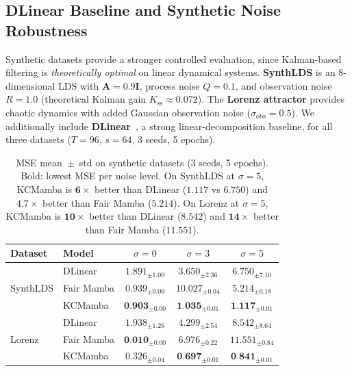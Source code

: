 \subsection{DLinear Baseline and Synthetic Noise Robustness}
\label{sec:dlinear_synth}

Synthetic datasets provide a stronger controlled evaluation, since Kalman-based filtering
is \emph{theoretically optimal} on linear dynamical systems.
\textbf{SynthLDS} is an 8-dimensional LDS with $\mathbf{A}=0{.}9\mathbf{I}$,
process noise $Q=0{.}1$, and observation noise $R=1{.}0$ (theoretical
Kalman gain $K_\text{ss}\approx0{.}072$).
The \textbf{Lorenz attractor} provides chaotic dynamics with added Gaussian
observation noise ($\sigma_\text{obs}=0{.}5$).
We additionally include \textbf{DLinear}~\cite{zeng2023transformers}, a strong
linear-decomposition baseline, for all three datasets
($T{=}96$, $s{=}64$, 3 seeds, 5 epochs).

\begin{table}[H]
  \centering
  \small
  \begin{tabular}{|l|l|ccc|}
    \hline
    \textbf{Dataset} & \textbf{Model} &
    $\sigma=0$ & $\sigma=3$ & $\sigma=5$ \\
    \hline\hline
    \multirow{3}{*}{SynthLDS}
      & DLinear    & $1{.}891_{\pm1{.}00}$ & $3{.}650_{\pm2{.}36}$ & $6{.}750_{\pm7{.}10}$ \\
      & Fair Mamba & $0{.}939_{\pm0{.}00}$ & $10{.}027_{\pm0{.}04}$ & $5{.}214_{\pm0{.}18}$ \\
      & KCMamba    & $\mathbf{0{.}903}_{\pm0{.}00}$ & $\mathbf{1{.}035}_{\pm0{.}01}$ & $\mathbf{1{.}117}_{\pm0{.}01}$ \\
    \hline
    \multirow{3}{*}{Lorenz}
      & DLinear    & $1{.}938_{\pm1{.}26}$ & $4{.}299_{\pm2{.}54}$ & $8{.}542_{\pm8{.}64}$ \\
      & Fair Mamba & $\mathbf{0{.}010}_{\pm0{.}00}$ & $6{.}976_{\pm0{.}22}$ & $11{.}551_{\pm0{.}84}$ \\
      & KCMamba    & $0{.}326_{\pm0{.}04}$ & $\mathbf{0{.}697}_{\pm0{.}01}$ & $\mathbf{0{.}841}_{\pm0{.}01}$ \\
    \hline
  \end{tabular}
  \caption{MSE mean~$\pm$~std on synthetic datasets (3 seeds, 5 epochs).
           Bold: lowest MSE per noise level.
           On SynthLDS at $\sigma{=}5$, KCMamba is $\mathbf{6\times}$ better than
           DLinear ($1{.}117$ vs $6{.}750$) and $\mathbf{4.7\times}$ better than
           Fair Mamba ($5{.}214$).
           On Lorenz at $\sigma{=}5$, KCMamba is $\mathbf{10\times}$ better than
           DLinear ($8{.}542$) and $\mathbf{14\times}$ better than Fair Mamba ($11{.}551$).}
  \label{tab:synth_noise}
\end{table}


